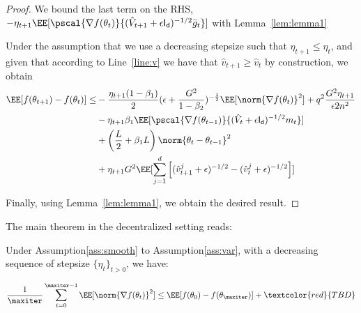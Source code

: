 \documentclass[11pt]{article}
\begin{document}
\begin{proof}
We bound the last term on the RHS, $ -\eta_{t+1} \EE[\pscal{\nabla f(\theta_t)}{(\hat{V}_{t+1} + \epsilon \mathsf{I_d})^{-1/2} \bar{g}_t}]$ with Lemma~\ref{lem:lemma1}

Under the assumption that we use a decreasing stepsize such that $\eta_{t+1} \leq \eta_{t}$, and given that according to Line~\ref{line:v} we have that $\hat v_{t+1} \geq \hat v_{t}$ by construction, we obtain 
\begin{equation}
\begin{split}
\EE[f(\theta_{t+1}) - f(\theta_{t}) ] \leq &   - \frac{\eta_{t+1}(1-\beta_1)}{2}  (\epsilon + \frac{G^2}{1 - \beta_2})^{-\frac{1}{2}} \EE[\norm{\nabla f(\theta_t)}^2] +q^2 \frac{G^2 \eta_{t+1}}{\epsilon 2n^2} \\
&- \eta_{t+1} \beta_1\EE[\pscal{\nabla f(\theta_{t-1})}{(\hat{V}_{t} + \epsilon \mathsf{I_d})^{-1/2} m_{t}}]\\
& +  \left(\frac{L}{2} + \beta_1 L \right) \norm{\theta_t - \theta_{t-1}}^2\\
&+   \eta_{t+1} G^2 \EE[\sum_{j=1}^d \left[(\hat{v}^j_{t+1} + \epsilon )^{-1/2} - (\hat{v}^j_{t} + \epsilon )^{-1/2}  \right] ]
\end{split}
\end{equation}

Finally, using Lemma~\ref{lem:lemma1}, we obtain the desired result.
\end{proof}


The main theorem in the decentralized setting reads:

\begin{Theorem}\label{thm:mainmultiple}
Under Assumption\ref{ass:smooth} to Assumption\ref{ass:var}, with a decreasing sequence of stepsize $\{\eta_t\}_{t>0}$, we have:

\begin{equation}
\begin{split}
\frac{1}{\maxiter} \sum_{t= 0}^{\maxiter-1} \EE[\norm{\nabla f(\theta_t)}^2] \leq \EE[f(\theta_{0}) - f(\theta_{\maxiter}) ] + \textcolor{red}{TBD}
\end{split}
\end{equation}
\end{Theorem}
\end{document}

